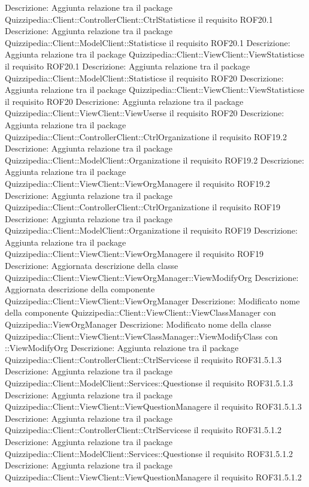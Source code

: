 Descrizione: Aggiunta relazione tra il package Quizzipedia::Client::ControllerClient::CtrlStatisticse il requisito ROF20.1 
Descrizione: Aggiunta relazione tra il package Quizzipedia::Client::ModelClient::Statisticse il requisito ROF20.1 
Descrizione: Aggiunta relazione tra il package Quizzipedia::Client::ViewClient::ViewStatisticse il requisito ROF20.1 
Descrizione: Aggiunta relazione tra il package Quizzipedia::Client::ModelClient::Statisticse il requisito ROF20 
Descrizione: Aggiunta relazione tra il package Quizzipedia::Client::ViewClient::ViewStatisticse il requisito ROF20 
Descrizione: Aggiunta relazione tra il package Quizzipedia::Client::ViewClient::ViewUserse il requisito ROF20 
Descrizione: Aggiunta relazione tra il package Quizzipedia::Client::ControllerClient::CtrlOrganizatione il requisito ROF19.2 
Descrizione: Aggiunta relazione tra il package Quizzipedia::Client::ModelClient::Organizatione il requisito ROF19.2 
Descrizione: Aggiunta relazione tra il package Quizzipedia::Client::ViewClient::ViewOrgManagere il requisito ROF19.2 
Descrizione: Aggiunta relazione tra il package Quizzipedia::Client::ControllerClient::CtrlOrganizatione il requisito ROF19 
Descrizione: Aggiunta relazione tra il package Quizzipedia::Client::ModelClient::Organizatione il requisito ROF19 
Descrizione: Aggiunta relazione tra il package Quizzipedia::Client::ViewClient::ViewOrgManagere il requisito ROF19 
Descrizione: Aggiornata descrizione della classe Quizzipedia::Client::ViewClient::ViewOrgManager::ViewModifyOrg 
Descrizione: Aggiornata descrizione della componente Quizzipedia::Client::ViewClient::ViewOrgManager 
Descrizione: Modificato nome della componente Quizzipedia::Client::ViewClient::ViewClassManager con Quizzipedia::ViewOrgManager 
Descrizione: Modificato nome della classe Quizzipedia::Client::ViewClient::ViewClassManager::ViewModifyClass con ::ViewModifyOrg 
Descrizione: Aggiunta relazione tra il package Quizzipedia::Client::ControllerClient::CtrlServicese il requisito ROF31.5.1.3 
Descrizione: Aggiunta relazione tra il package Quizzipedia::Client::ModelClient::Services::Questionse il requisito ROF31.5.1.3 
Descrizione: Aggiunta relazione tra il package Quizzipedia::Client::ViewClient::ViewQuestionManagere il requisito ROF31.5.1.3 
Descrizione: Aggiunta relazione tra il package Quizzipedia::Client::ControllerClient::CtrlServicese il requisito ROF31.5.1.2 
Descrizione: Aggiunta relazione tra il package Quizzipedia::Client::ModelClient::Services::Questionse il requisito ROF31.5.1.2 
Descrizione: Aggiunta relazione tra il package Quizzipedia::Client::ViewClient::ViewQuestionManagere il requisito ROF31.5.1.2 

